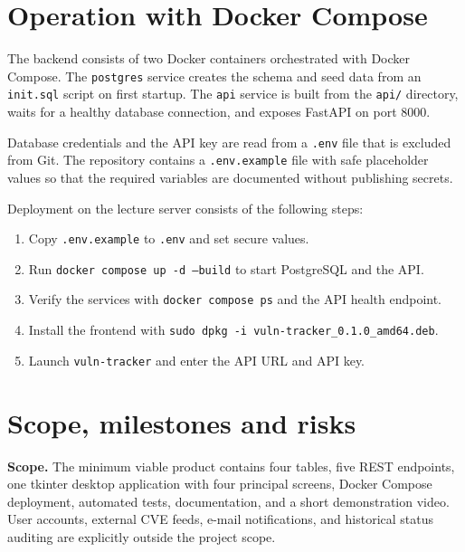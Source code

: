 \documentclass[11pt,a4paper]{article}
\begin{document}
\section{Operation with Docker Compose}

The backend consists of two Docker containers orchestrated with Docker Compose.
The \texttt{postgres} service creates the schema and seed data from an
\texttt{init.sql} script on first startup. The \texttt{api} service is built
from the \texttt{api/} directory, waits for a healthy database connection, and
exposes FastAPI on port 8000.

Database credentials and the API key are read from a \texttt{.env} file that is
excluded from Git. The repository contains a \texttt{.env.example} file with
safe placeholder values so that the required variables are documented without
publishing secrets.

Deployment on the lecture server consists of the following steps:

\begin{enumerate}
  \item Copy \texttt{.env.example} to \texttt{.env} and set secure values.
  \item Run \texttt{docker compose up -d --build} to start PostgreSQL and the API.
  \item Verify the services with \texttt{docker compose ps} and the API health
        endpoint.
  \item Install the frontend with
        \texttt{sudo dpkg -i vuln-tracker\_0.1.0\_amd64.deb}.
  \item Launch \texttt{vuln-tracker} and enter the API URL and API key.
\end{enumerate}

\section{Scope, milestones and risks}

\textbf{Scope.} The minimum viable product contains four tables, five REST
endpoints, one tkinter desktop application with four principal screens, Docker
Compose deployment, automated tests, documentation, and a short demonstration
video. User accounts, external CVE feeds, e-mail notifications, and historical
status auditing are explicitly outside the project scope.
\end{document}
